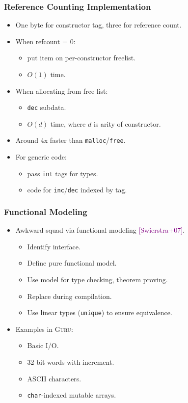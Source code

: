 \documentclass[11pt]{beamer}
\begin{document}
\begin{frame}
\frametitle{Reference Counting Implementation}
\begin{itemize}
\item One byte for constructor tag, three for reference count.
\item When refcount = 0: 
\begin{itemize}
\item put item on per-constructor freelist.
\item $O(1)$ time.
\end{itemize}
\item When allocating from free list:
\begin{itemize}
\item \texttt{dec} subdata.
\item $O(d)$ time, where $d$ is arity of constructor.
\end{itemize}
\item Around 4x faster than \texttt{malloc}/\texttt{free}.
\item For generic code:
\begin{itemize}
\item pass \texttt{int} tags for types.
\item code for \texttt{inc}/\texttt{dec} indexed by tag.
\end{itemize}
\end{itemize}
\end{frame}

\begin{frame}
\frametitle{Functional Modeling}

\begin{itemize}
\item Awkward squad via functional modeling \textcolor{purple}{[Swierstra+07]}.
\begin{itemize}
\item Identify interface.
\item Define pure functional model.
\item Use model for type checking, theorem proving.
\item Replace during compilation.
\item Use linear types (\texttt{unique}) to ensure equivalence.
\end{itemize}
\item Examples in \textsc{Guru}:
\begin{itemize}
\item Basic I/O.
\item 32-bit words with increment.
\item ASCII characters.
\item \texttt{char}-indexed mutable arrays.
\end{itemize}
\end{itemize}

\end{frame}
\end{document}
